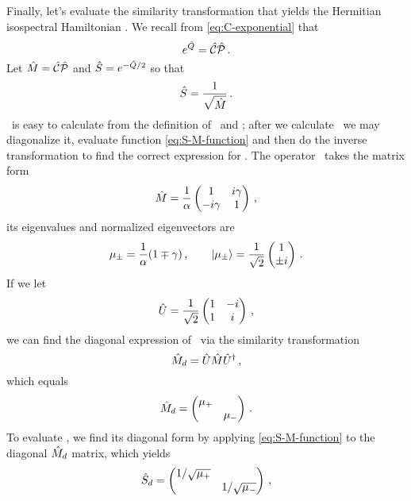         Finally, let's evaluate the similarity transformation that yields the Hermitian isospectral Hamiltonian \hF. We recall from \eqref{eq:C-exponential} that
        \begin{equation*}
            e^{\hat{Q}} = \mathcal{\hat{C}}\mathcal{\hat{P}}
            \,\text{.}
        \end{equation*}
        Let $\hat{M} = \mathcal{\hat{C}}\mathcal{\hat{P}}$ and $\hat{S} = e^{-\hat{Q}/2}$ so that
        \begin{equation}
            \label{eq:S-M-function}
            \hat{S} = \frac{1}{\sqrt{\hat{M}}}
            \,\text{.}
        \end{equation}
        \hM\ is easy to calculate from the definition of \hC\ and \hP; after we calculate \hM\ we may diagonalize it, evaluate function \eqref{eq:S-M-function} and then do the inverse transformation to find the correct expression for \hS. The operator \hM\ takes the matrix form
        \begin{equation*}
            \hM = \frac{1}{\alpha}\pmqty{\admat[1]{i\gamma, -i\gamma}}
            \mycomma
        \end{equation*}
        its eigenvalues and normalized eigenvectors are
        \begin{equation*}
            \mu_{\pm} = \frac{1}{\alpha}\pqty{1 \mp \gamma}
            \mycomma
            \qquad
            \ket{\mu_\pm} = \frac{1}{\sqrt{2}}\pmqty{1 \\ \pm i}
            \myperiod
        \end{equation*}
        If we let
        \begin{equation*}
            \hU = \frac{1}{\sqrt{2}}\pmqty{1 & -i \\ 1 & i}
            \mycomma
        \end{equation*}
        we can find the diagonal expression of \hM\ via the similarity transformation
        \begin{equation}
            \hat{M}_d = \hat{U} \hat{M} \hat{U}^\dag
            \,\text{,}
        \end{equation}
        which equals
        \begin{equation*}
            \hM_d = \pmqty{\dmat{\mu_{+}, \mu_{-}}}
            \myperiod
        \end{equation*}
        To evaluate \hS, we find its diagonal form by applying \eqref{eq:S-M-function} to the diagonal $\hat{M}_d$ matrix, which yields
        \begin{equation*}
            \hS_d = \pmqty{\dmat{1/\sqrt{\mu_{+}}, 1/\sqrt{\mu_{-}}}}
            \mycomma
        \end{equation*}
